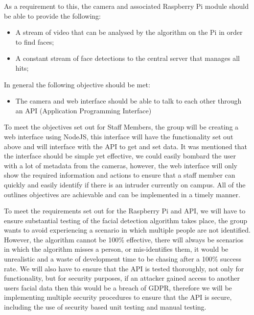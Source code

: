 \documentclass[
  english,
  a4paper,
,tablecaptionabove
]{scrartcl}
\providecommand{\tightlist}{%
  \setlength{\itemsep}{0pt}\setlength{\parskip}{0pt}}
\begin{document}
As a requirement to this, the camera and associated Raspberry Pi module
should be able to provide the following:

\begin{itemize}
\tightlist
\item
  A stream of video that can be analysed by the algorithm on the Pi in
  order to find faces;
\item
  A constant stream of face detections to the central server that
  manages all hits;
\end{itemize}

In general the following objective should be met:

\begin{itemize}
\tightlist
\item
  The camera and web interface should be able to talk to each other
  through an API (Application Programming Interface)
\end{itemize}

To meet the objectives set out for Staff Members, the group will be
creating a web interface using NodeJS, this interface will have the
functionality set out above and will interface with the API to get and
set data. It was mentioned that the interface should be simple yet
effective, we could easily bombard the user with a lot of metadata from
the cameras, however, the web interface will only show the required
information and actions to ensure that a staff member can quickly and
easily identify if there is an intruder currently on campus. All of the
outlines objectives are achievable and can be implemented in a timely
manner.

To meet the requirements set out for the Raspberry Pi and API, we will
have to ensure substantial testing of the facial detection algorithm
takes place, the group wants to avoid experiencing a scenario in which
multiple people are not identified. However, the algorithm cannot be
100\% effective, there will always be scenarios in which the algorithm
misses a person, or mis-identifies them, it would be unrealistic and a
waste of development time to be chasing after a 100\% success rate. We
will also have to ensure that the API is tested thoroughly, not only for
functionality, but for security purposes, if an attacker gained access
to another users facial data then this would be a breach of GDPR,
therefore we will be implementing multiple security procedures to ensure
that the API is secure, including the use of security based unit testing
and manual testing.

\newpage
\end{document}
